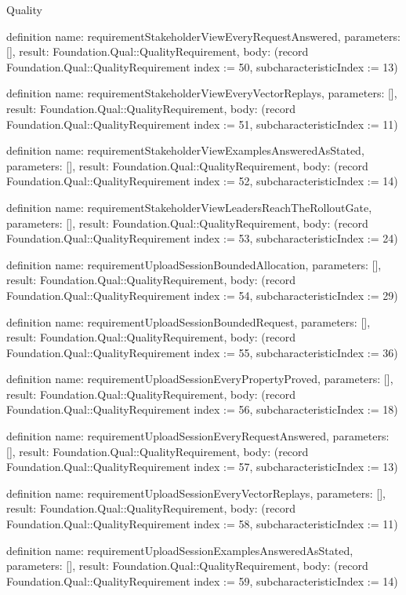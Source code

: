 \begin{lexlean}{Quality}
\begin{semanticmodule}
definition{
  name: requirementStakeholderViewEveryRequestAnswered,
  parameters: [],
  result: Foundation.Qual::QualityRequirement,
  body: (record Foundation.Qual::QualityRequirement {index := 50, subcharacteristicIndex := 13})
}

definition{
  name: requirementStakeholderViewEveryVectorReplays,
  parameters: [],
  result: Foundation.Qual::QualityRequirement,
  body: (record Foundation.Qual::QualityRequirement {index := 51, subcharacteristicIndex := 11})
}

definition{
  name: requirementStakeholderViewExamplesAnsweredAsStated,
  parameters: [],
  result: Foundation.Qual::QualityRequirement,
  body: (record Foundation.Qual::QualityRequirement {index := 52, subcharacteristicIndex := 14})
}

definition{
  name: requirementStakeholderViewLeadersReachTheRolloutGate,
  parameters: [],
  result: Foundation.Qual::QualityRequirement,
  body: (record Foundation.Qual::QualityRequirement {index := 53, subcharacteristicIndex := 24})
}

definition{
  name: requirementUploadSessionBoundedAllocation,
  parameters: [],
  result: Foundation.Qual::QualityRequirement,
  body: (record Foundation.Qual::QualityRequirement {index := 54, subcharacteristicIndex := 29})
}

definition{
  name: requirementUploadSessionBoundedRequest,
  parameters: [],
  result: Foundation.Qual::QualityRequirement,
  body: (record Foundation.Qual::QualityRequirement {index := 55, subcharacteristicIndex := 36})
}

definition{
  name: requirementUploadSessionEveryPropertyProved,
  parameters: [],
  result: Foundation.Qual::QualityRequirement,
  body: (record Foundation.Qual::QualityRequirement {index := 56, subcharacteristicIndex := 18})
}

definition{
  name: requirementUploadSessionEveryRequestAnswered,
  parameters: [],
  result: Foundation.Qual::QualityRequirement,
  body: (record Foundation.Qual::QualityRequirement {index := 57, subcharacteristicIndex := 13})
}

definition{
  name: requirementUploadSessionEveryVectorReplays,
  parameters: [],
  result: Foundation.Qual::QualityRequirement,
  body: (record Foundation.Qual::QualityRequirement {index := 58, subcharacteristicIndex := 11})
}

definition{
  name: requirementUploadSessionExamplesAnsweredAsStated,
  parameters: [],
  result: Foundation.Qual::QualityRequirement,
  body: (record Foundation.Qual::QualityRequirement {index := 59, subcharacteristicIndex := 14})
}


\end{semanticmodule}
\end{lexlean}
